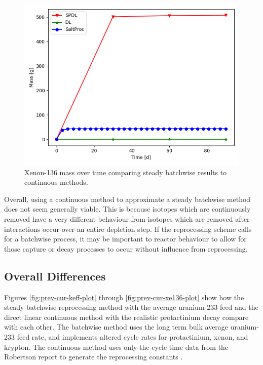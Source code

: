 \begin{figure}[H]
  \centering
  \includegraphics[scale=0.7]{images/soln-1-2-xe136.png}
  \caption{Xenon-136 mass over time comparing steady batchwise results to continuous methods.}
   \label{fig:steady-compare-xe136}
\end{figure}

Overall, using a continuous method to approximate a steady batchwise method does not seem generally viable. This is because isotopes which are continuously removed have a very different behaviour from isotopes which are removed after interactions occur over an entire depletion step. If the reprocessing scheme calls for a batchwise process, it may be important to reactor behaviour to allow for those capture or decay processes to occur without influence from reprocessing.

\subsection{Overall Differences}

Figures \ref{fig:prev-cur-keff-plot} through  \ref{fig:prev-cur-xe136-plot} show how the steady batchwise reprocessing method with the average uranium-233 feed and the direct linear continuous method with the realistic protactinium decay compare with each other.
The batchwise method uses the long term bulk average uranium-233 feed rate, and implements altered cycle rates for protactinium, xenon, and krypton. The continuous method uses only the cycle time data from the Robertson report to generate the reprocessing constants \cite{robertson_conceptual_1971}.

